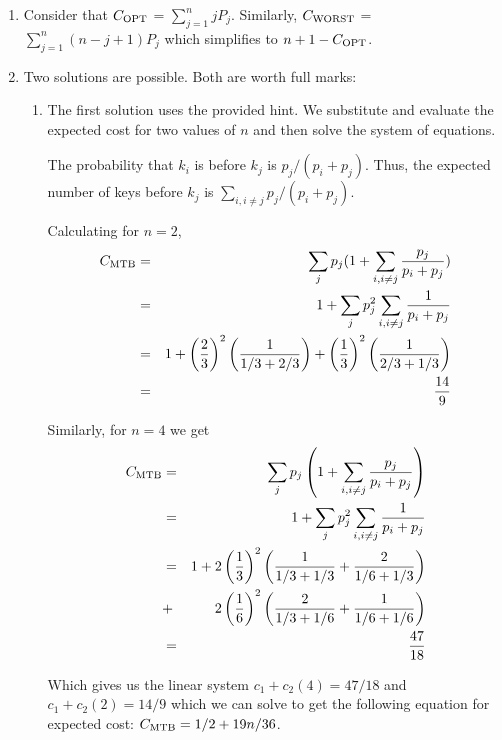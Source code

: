 \begin{solution}
\begin{enumerate}

  \item Consider that $C_{\hbox{\scriptsize OPT}}$ = $\sum_{j=1}^{n} j  P_j$.
%
  Similarly, $C_{\hbox{\scriptsize WORST}}$ = $\sum_{j=1}^{n} (n - j + 1)P_j$
  which simplifies to $n+1-C_{\hbox{\scriptsize OPT}}$.


  \item Two solutions are possible. Both are worth full marks:
     \begin{enumerate}
	\item The first solution uses the provided hint. We substitute and evaluate
	the expected cost for two values of $n$ and then solve the system of equations.

	The probability that $k_i$ is before $k_j$ is $p_j/(p_i+p_j)$.
	Thus, the expected number
	of keys before $k_j$ is $\sum_{i,i\neq j} p_j/(p_i+p_j)$.

	Calculating for $n=2$,
	 \begin{eqnarray*}
	 C_{\hbox{\scriptsize MTB}} &= &
	  \sum_j p_j(1+ \sum_{i,i\neq j} \frac{p_j}{p_i+p_j})\\
	  & = & 1 + \sum_j p_j^2 \sum_{i,i\neq j} \frac{1}{p_i+p_j}\\
	  & = & 1 + \left (\frac{2}{3}\right )^2 \left (\frac{1}{1/3 +
                     2/3}\right )
   		  + \left (\frac{1}{3}\right )^2 \left (\frac{1}{2/3 + 1/3}
                    \right )   \\
	  & = & \frac{14}{9}
	 \end{eqnarray*}

	Similarly, for $n=4$ we get
	 \begin{eqnarray*}
	 C_{\hbox{\scriptsize MTB}} &= &
	  \sum_j p_j\left (1+ \sum_{i,i\neq j} \frac{p_j}{p_i+p_j}\right)\\
	  & = & 1 + \sum_j p_j^2 \sum_{i,i\neq j} \frac{1}{p_i+p_j}\\
	  & = & 1 + 2\left (\frac{1}{3}\right )^2 \left (\frac{1}{1/3 + 1/3} + \frac{2}{1/6 + 1/3}\right) \\
          & + &	2\left (\frac{1}{6}\right )^2 \left(\frac{2}{1/3 + 1/6} + \frac{1}{1/6 + 1/6}\right)   \\
	  & = & \frac{47}{18}
	 \end{eqnarray*}

	 Which gives us the linear system $c_1 + c_2(4) = 47/18$ and
 $c_1 + c_2(2) = 14/9$
	 which we can solve to get the following equation for expected cost:
	  $C_{\hbox{\scriptsize MTB}} = 1/2 + 19n/36$.


\end{enumerate}
\end{enumerate}
\end{solution}
